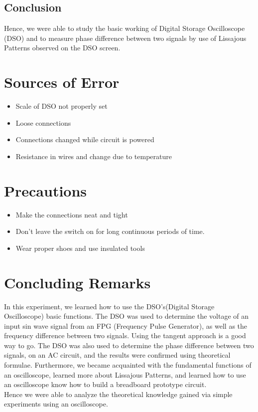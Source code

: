 \documentclass{article}
\begin{document}
\subsection{Conclusion}
Hence, we were able to study the basic working of Digital Storage Oscilloscope (DSO) and to measure phase difference between two signals by use of Lissajous Patterns observed on the DSO screen.

\newpage
\section{Sources of Error}
\begin{itemize}
    \item Scale of DSO not properly set
    \item Loose connections
    \item Connections changed while circuit is powered
    \item Resistance in wires and change due to temperature
\end{itemize}
\section{Precautions}

\begin{itemize}
    \item Make the connections neat and tight
    \item Don’t leave the switch on for long continuous periods of time.
    \item Wear proper shoes and use insulated tools
\end{itemize}

\section{Concluding Remarks}
In this experiment, we learned how to use the DSO's(Digital Storage Oscilloscope) basic functions. The DSO was used to determine the voltage of an input sin wave signal from an FPG (Frequency Pulse Generator), as well as the frequency difference between two signals. Using the tangent approach is a good way to go. The DSO was also used to determine the phase difference between two signals, on an AC circuit, and the results were confirmed using theoretical formulae. Furthermore, we became acquainted with the fundamental functions of an oscilloscope, learned more about Lissajous Patterns, and learned how to use an oscilloscope know how to build a breadboard prototype circuit. \\
Hence we were able to analyze the theoretical knowledge gained via simple experiments using an oscilloscope.
\end{document}
